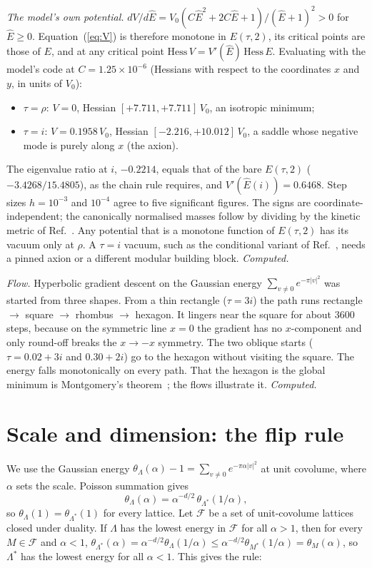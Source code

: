 \documentclass[aps,prd,twocolumn,superscriptaddress,nofootinbib,showkeys]{revtex4-2}
\begin{document}
\emph{The model's own potential.} $dV/d\hat E=V_0(C\hat E^2+2C\hat E+1)/(\hat E+1)^2>0$ for $\hat E\ge0$. Equation~(\ref{eq:V}) is therefore monotone in $E(\tau,2)$, its critical points are those of $E$, and at any critical point $\mathrm{Hess}\,V=V'(\hat E)\,\mathrm{Hess}\,E$. Evaluating with the model's code at $C=1.25\times10^{-6}$ (Hessians with respect to the coordinates $x$ and $y$, in units of $V_0$):
\begin{itemize}
\item $\tau=\rho$: $V=0$, Hessian $[+7.711,+7.711]\,V_0$, an isotropic minimum;
\item $\tau=i$: $V=0.1958\,V_0$, Hessian $[-2.216,+10.012]\,V_0$, a saddle whose negative mode is purely along $x$ (the axion).
\end{itemize}
The eigenvalue ratio at $i$, $-0.2214$, equals that of the bare $E(\tau,2)$ ($-3.4268/15.4805$), as the chain rule requires, and $V'(\hat E(i))=0.6468$. Step sizes $h=10^{-3}$ and $10^{-4}$ agree to five significant figures. The signs are coordinate-independent; the canonically normalised masses follow by dividing by the kinetic metric of Ref.~\cite{P3}. Any potential that is a monotone function of $E(\tau,2)$ has its vacuum only at $\rho$. A $\tau=i$ vacuum, such as the conditional variant of Ref.~\cite{P5}, needs a pinned axion or a different modular building block. \emph{Computed.}

\emph{Flow.} Hyperbolic gradient descent on the Gaussian energy $\sum_{v\ne0}e^{-\pi|v|^2}$ was started from three shapes. From a thin rectangle ($\tau=3i$) the path runs rectangle $\to$ square $\to$ rhombus $\to$ hexagon. It lingers near the square for about 3600 steps, because on the symmetric line $x=0$ the gradient has no $x$-component and only round-off breaks the $x\to-x$ symmetry. The two oblique starts ($\tau=0.02+3i$ and $0.30+2i$) go to the hexagon without visiting the square. The energy falls monotonically on every path. That the hexagon is the global minimum is Montgomery's theorem~\cite{Montgomery}; the flows illustrate it. \emph{Computed.}

\section{Scale and dimension: the flip rule}
We use the Gaussian energy $\theta_\Lambda(\alpha)-1=\sum_{v\neq0}e^{-\pi\alpha|v|^2}$ at unit covolume, where $\alpha$ sets the scale. Poisson summation gives
\begin{equation}
\theta_\Lambda(\alpha)=\alpha^{-d/2}\,\theta_{\Lambda^*}(1/\alpha),
\label{eq:P}
\end{equation}
so $\theta_\Lambda(1)=\theta_{\Lambda^*}(1)$ for every lattice. Let $\mathcal F$ be a set of unit-covolume lattices closed under duality. If $\Lambda$ has the lowest energy in $\mathcal F$ for all $\alpha>1$, then for every $M\in\mathcal F$ and $\alpha<1$, $\theta_{\Lambda^*}(\alpha)=\alpha^{-d/2}\theta_\Lambda(1/\alpha)\le\alpha^{-d/2}\theta_{M^*}(1/\alpha)=\theta_M(\alpha)$, so $\Lambda^*$ has the lowest energy for all $\alpha<1$. This gives the rule:
\end{document}
